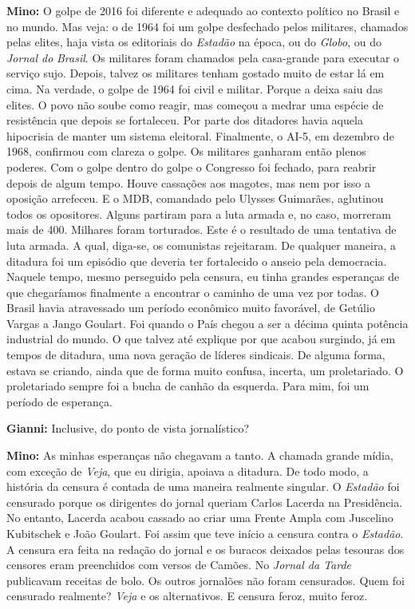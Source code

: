 \textbf{Mino:} O golpe de 2016 foi diferente e adequado ao contexto
político no Brasil e no mundo. Mas veja: o de 1964 foi um golpe
desfechado pelos militares, chamados pelas elites, haja vista os
editoriais do \emph{Estadão} na época, ou do \emph{Globo}, ou do
\emph{Jornal do} \emph{Brasil}. Os militares foram chamados pela
casa-grande para executar o serviço sujo. Depois, talvez os militares
tenham gostado muito de estar lá em cima. Na verdade, o golpe de 1964
foi civil e militar. Porque a deixa saiu das elites. O povo não soube
como reagir, mas começou a medrar uma espécie de resistência que depois
se fortaleceu. Por parte dos ditadores havia aquela hipocrisia de manter
um sistema eleitoral. Finalmente, o AI-5, em dezembro de 1968, confirmou
com clareza o golpe. Os militares ganharam então plenos poderes. Com o
golpe dentro do golpe o Congresso foi fechado, para reabrir depois de
algum tempo. Houve cassações aos magotes, mas nem por isso a oposição
arrefeceu. E o MDB, comandado pelo Ulysses Guimarães, aglutinou todos os
opositores. Alguns partiram para a luta armada e, no caso, morreram mais
de 400. Milhares foram torturados. Este é o resultado de uma tentativa
de luta armada. A qual, diga-se, os comunistas rejeitaram. De qualquer
maneira, a ditadura foi um episódio que deveria ter fortalecido o anseio
pela democracia. Naquele tempo, mesmo perseguido pela censura, eu tinha
grandes esperanças de que chegaríamos finalmente a encontrar o caminho
de uma vez por todas. O Brasil havia atravessado um período econômico
muito favorável, de Getúlio Vargas a Jango Goulart. Foi quando o País
chegou a ser a décima quinta potência industrial do mundo. O que talvez
até explique por que acabou surgindo, já em tempos de ditadura, uma nova
geração de líderes sindicais. De alguma forma, estava se criando, ainda
que de forma muito confusa, incerta, um proletariado. O proletariado
sempre foi a bucha de canhão da esquerda. Para mim, foi um período de
esperança.

\textbf{Gianni:} Inclusive, do ponto de vista jornalístico?

\textbf{Mino:} As minhas esperanças não chegavam a tanto. A chamada
grande mídia, com exceção de \emph{Veja}, que eu dirigia, apoiava a
ditadura. De todo modo, a história da censura é contada de uma maneira
realmente singular. O \emph{Estadão} foi censurado porque os dirigentes
do jornal queriam Carlos Lacerda na Presidência. No entanto, Lacerda
acabou cassado ao criar uma Frente Ampla com Juscelino Kubitschek e João
Goulart. Foi assim que teve início a censura contra o \emph{Estadão}. A
censura era feita na redação do jornal e os buracos deixados pelas
tesouras dos censores eram preenchidos com versos de Camões. No
\emph{Jornal da Tarde} publicavam receitas de bolo. Os outros jornalões
não foram censurados. Quem foi censurado realmente? \emph{Veja} e os
alternativos. E censura feroz, muito feroz.


